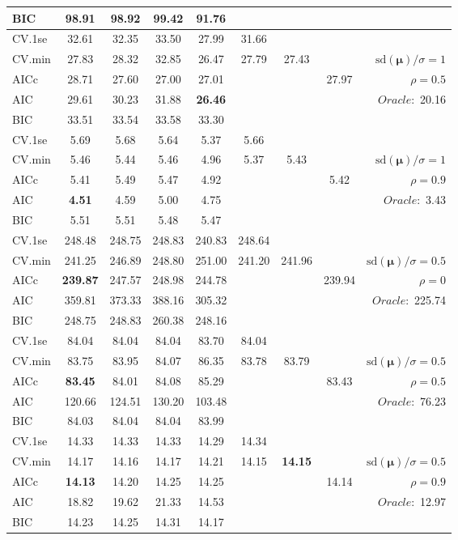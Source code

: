 \begin{table}
\begin{center}
\begin{tabular}{l*{7}{c}|r}
BIC & 98.91 & 98.92 & 99.42 & 91.76 & & & &  \\
 \hline 
CV.1se & 32.61 & 32.35 & 33.50 & 27.99 & 31.66 & & & \\
CV.min & 27.83 & 28.32 & 32.85 & 26.47 & 27.79 & 27.43 & & $\mathrm{sd}(\mathbf{\mu})/\sigma=1$ \\
AICc & 28.71 & 27.60 & 27.00 & 27.01 & & & 27.97 &  $\rho=0.5$ \\
AIC & 29.61 & 30.23 & 31.88 & {\bf 26.46} & & & &  \multirow{2}{*}{$Oracle: $ 20.16} \\
BIC & 33.51 & 33.54 & 33.58 & 33.30 & & & &  \\
 \hline 
CV.1se & 5.69 & 5.68 & 5.64 & 5.37 & 5.66 & & & \\
CV.min & 5.46 & 5.44 & 5.46 & 4.96 & 5.37 & 5.43 & & $\mathrm{sd}(\mathbf{\mu})/\sigma=1$ \\
AICc & 5.41 & 5.49 & 5.47 & 4.92 & & & 5.42 &  $\rho=0.9$ \\
AIC & {\bf 4.51} & 4.59 & 5.00 & 4.75 & & & &  \multirow{2}{*}{$Oracle: $ 3.43} \\
BIC & 5.51 & 5.51 & 5.48 & 5.47 & & & &  \\
 \hline 
CV.1se & 248.48 & 248.75 & 248.83 & 240.83 & 248.64 & & & \\
CV.min & 241.25 & 246.89 & 248.80 & 251.00 & 241.20 & 241.96 & & $\mathrm{sd}(\mathbf{\mu})/\sigma=0.5$ \\
AICc & {\bf 239.87} & 247.57 & 248.98 & 244.78 & & & 239.94 &  $\rho=0$ \\
AIC & 359.81 & 373.33 & 388.16 & 305.32 & & & &  \multirow{2}{*}{$Oracle: $ 225.74} \\
BIC & 248.75 & 248.83 & 260.38 & 248.16 & & & &  \\
 \hline 
CV.1se & 84.04 & 84.04 & 84.04 & 83.70 & 84.04 & & & \\
CV.min & 83.75 & 83.95 & 84.07 & 86.35 & 83.78 & 83.79 & & $\mathrm{sd}(\mathbf{\mu})/\sigma=0.5$ \\
AICc & {\bf 83.45} & 84.01 & 84.08 & 85.29 & & & 83.43 &  $\rho=0.5$ \\
AIC & 120.66 & 124.51 & 130.20 & 103.48 & & & &  \multirow{2}{*}{$Oracle: $ 76.23} \\
BIC & 84.03 & 84.04 & 84.04 & 83.99 & & & &  \\
 \hline 
CV.1se & 14.33 & 14.33 & 14.33 & 14.29 & 14.34 & & & \\
CV.min & 14.17 & 14.16 & 14.17 & 14.21 & 14.15 & {\bf 14.15} & & $\mathrm{sd}(\mathbf{\mu})/\sigma=0.5$ \\
AICc & {\bf 14.13} & 14.20 & 14.25 & 14.25 & & & 14.14 &  $\rho=0.9$ \\
AIC & 18.82 & 19.62 & 21.33 & 14.53 & & & &  \multirow{2}{*}{$Oracle: $ 12.97} \\
BIC & 14.23 & 14.25 & 14.31 & 14.17 & & & &  \\
 \hline 
\end{tabular}
\end{center}
\vspace{-1cm}
\end{table}




